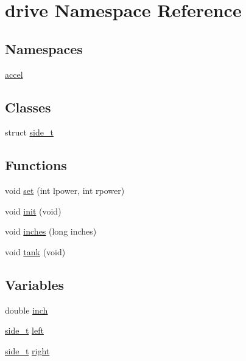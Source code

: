 \hypertarget{namespacedrive}{}\section{drive Namespace Reference}
\label{namespacedrive}
\subsection*{Namespaces}
\begin{DoxyCompactItemize}
\item 
 \hyperlink{namespacedrive_1_1accel}{accel}
\end{DoxyCompactItemize}
\subsection*{Classes}
\begin{DoxyCompactItemize}
\item 
struct \hyperlink{structdrive_1_1side__t}{side\+\_\+t}
\end{DoxyCompactItemize}
\subsection*{Functions}
\begin{DoxyCompactItemize}
\item 
void \hyperlink{namespacedrive_a2df65772c3853804f68f3358b04420b2}{set} (int lpower, int rpower)
\item 
void \hyperlink{namespacedrive_afb11be06c88e18373ad210a65e146d53}{init} (void)
\item 
void \hyperlink{namespacedrive_ab1c99e0f944b404b036034bac0074ca6}{inches} (long inches)
\item 
void \hyperlink{namespacedrive_a4468fd8982ce72051c07b37cf1f91185}{tank} (void)
\end{DoxyCompactItemize}
\subsection*{Variables}
\begin{DoxyCompactItemize}
\item 
double \hyperlink{namespacedrive_ac57641567511fcbc0ce6bf72b1aff76e}{inch}
\item 
\hyperlink{structdrive_1_1side__t}{side\+\_\+t} \hyperlink{namespacedrive_abde1df4410c0d0bfc462f3fb33ab9c5d}{left}
\item 
\hyperlink{structdrive_1_1side__t}{side\+\_\+t} \hyperlink{namespacedrive_a6adcb98f34f373f5e1fae1c46b8d7269}{right}
\end{DoxyCompactItemize}


